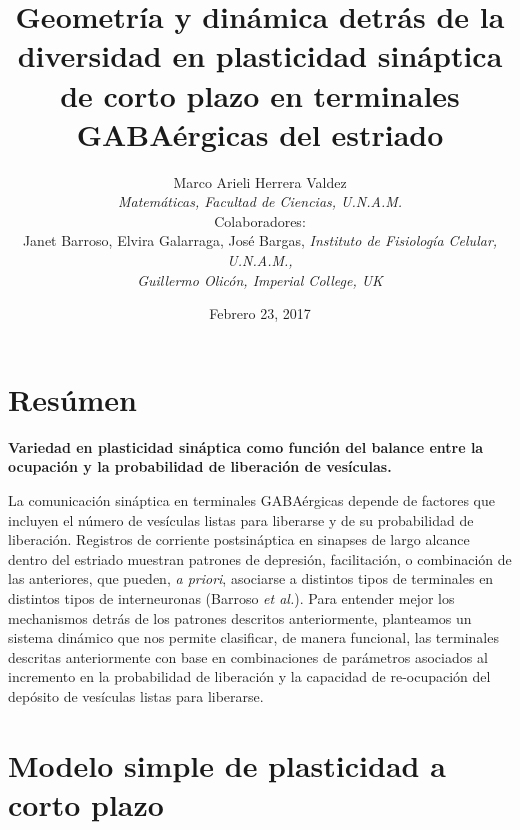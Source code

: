 \documentclass[8pt]{beamer}
\title[Geometría y dinámica de la plasticidad sináptica]{Geometría y
  dinámica detrás de la diversidad en plasticidad sináptica de corto
  plazo en terminales GABAérgicas del estriado}
\author[Marco Arieli Herrera Valdez, marcoh@ciencias]{Marco Arieli Herrera Valdez \\ 
\textit{Matemáticas, Facultad de Ciencias, U.N.A.M.}\\
\vspace{10pt}
\small{Colaboradores: \\
Janet Barroso, Elvira Galarraga, José Bargas, 
\textit{Instituto de Fisiología Celular, U.N.A.M., \\
Guillermo Olicón, Imperial College, UK
}}
}
\date{Febrero 23, 2017}
\begin{document}
\begin{frame}
\maketitle
\end{frame}

\section{Resúmen}
\begin{frame}

\textbf{Variedad en plasticidad sináptica como función del balance entre la ocupación y la probabilidad de liberación de vesículas.}

\vspace{13pt} La comunicación sináptica en terminales GABAérgicas
depende de factores que incluyen el número de vesículas listas para
liberarse y de su probabilidad de liberación.  Registros de corriente
postsináptica en sinapses de largo alcance dentro del estriado
muestran patrones de depresión, facilitación, o combinación de las
anteriores, que pueden, \textit{a priori}, asociarse a distintos tipos
de terminales en distintos tipos de interneuronas (Barroso \textit{et
  al.}). Para entender mejor los mechanismos detrás de los patrones
descritos anteriormente, planteamos un sistema dinámico que nos
permite clasificar, de manera funcional, las terminales descritas
anteriormente con base en combinaciones de parámetros asociados al
incremento en la probabilidad de liberación y la capacidad de
re-ocupación del depósito de vesículas listas para liberarse.
\end{frame}

%
\section{Modelo simple de plasticidad a corto plazo}
\end{document}
